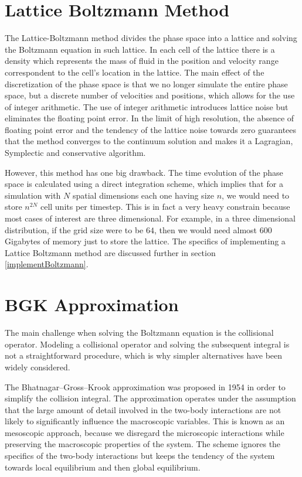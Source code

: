 \section{Lattice Boltzmann Method}
\label{boltz}
The Lattice-Boltzmann method divides the phase space into a lattice and solving the Boltzmann equation in such lattice.
In each cell of the lattice there is a density which represents the mass of fluid in the position and velocity range correspondent to the cell's location in the lattice.
The main effect of the discretization of the phase space is that we no longer simulate the entire phase space, but a discrete number of velocities and positions, which allows for the use of integer arithmetic. The use of integer arithmetic introduces lattice noise but eliminates the floating point error. In the limit of high resolution, the absence of floating point error and the tendency of the lattice noise towards zero guarantees that the method converges to the continuum solution and makes it a Lagragian, Symplectic and conservative algorithm. 

However, this method has one big drawback. The time evolution of the phase space is calculated using a direct integration scheme, which implies that for a simulation with $N$ spatial dimensions each one having size $n$, we would need to store $n^{2N}$ cell units per timestep. This is in fact a very heavy constrain because most cases of interest are three dimensional. For example, in a three dimensional distribution, if the grid size were to be $64$, then we would need almost 600 Gigabytes of memory just to store the lattice. 
The specifics of implementing a Lattice Boltzmann method are discussed further in section \ref{implementBoltzmann}.



\section{BGK Approximation}
\label{bgk}
The main challenge when solving the Boltzmann equation is the collisional operator. Modeling a collisional operator and solving the subsequent integral is not a straightforward procedure, which is why simpler alternatives have been widely considered.

The Bhatnagar–Gross–Krook approximation was proposed in 1954 \cite{1954PhRv...94..511B} in order to simplify the collision integral.
The approximation operates under the assumption that the large amount of detail involved in the two-body interactions are not likely to significantly influence the macroscopic variables\cite{asinari}.
This is known as an mesoscopic approach, because we disregard the microscopic interactions while preserving the macroscopic properties of the system. 
The scheme ignores the specifics of the two-body interactions but keeps the tendency of the system towards local equilibrium and then global equilibrium.

